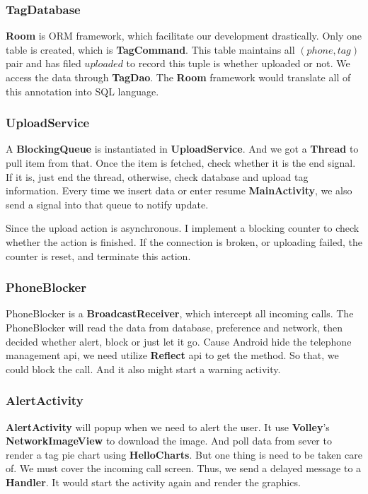 \documentclass{article}
\begin{document}
\subsubsection{TagDatabase}
\textbf{Room} \cite{room} is ORM framework, which facilitate our development drastically. Only one table is created, which is \textbf{TagCommand}. This table maintains all $(phone, tag)$ pair and has filed $uploaded$ to record this tuple is whether uploaded or not. We access the data through \textbf{TagDao}. The \textbf{Room} framework would translate all of this annotation into SQL language.

\subsubsection{UploadService}
A \textbf{BlockingQueue} is instantiated in \textbf{UploadService}. And we got a \textbf{Thread} to pull item from that. Once the item is fetched, check whether it is the end signal. If it is, just end the thread, otherwise, check database and upload tag information. Every time we insert data or enter resume \textbf{MainActivity}, we also send a signal into that queue to notify update.

Since the upload action is asynchronous. I implement a blocking counter to check whether the action is finished. If the connection is broken, or uploading failed, the counter is reset, and terminate this action.

\subsubsection{PhoneBlocker}
PhoneBlocker is a \textbf{BroadcastReceiver}, which intercept all incoming calls. The PhoneBlocker will read the data from database, preference and network, then decided whether alert, block or just let it go. Cause Android hide the telephone management api, we need utilize \textbf{Reflect} api to get the method. So that, we could block the call. And it also might start a warning activity. 

\subsubsection{AlertActivity}
\textbf{AlertActivity} will popup when we need to alert the user. It use \textbf{Volley}'s \textbf{NetworkImageView} \cite{volley}to download the image. And poll data from sever to render a tag pie chart using \textbf{HelloCharts}. But one thing is need to be taken care of. We must cover the incoming call screen. Thus, we send a delayed message to a \textbf{Handler}. It would start the activity again and render the graphics.
\end{document}
